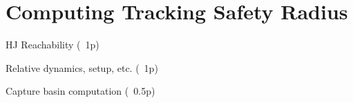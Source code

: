 \section{Computing Tracking Safety Radius \label{sec:reachability}}
HJ Reachability (~1p)

Relative dynamics, setup, etc. (~1p)

Capture basin computation (~0.5p)